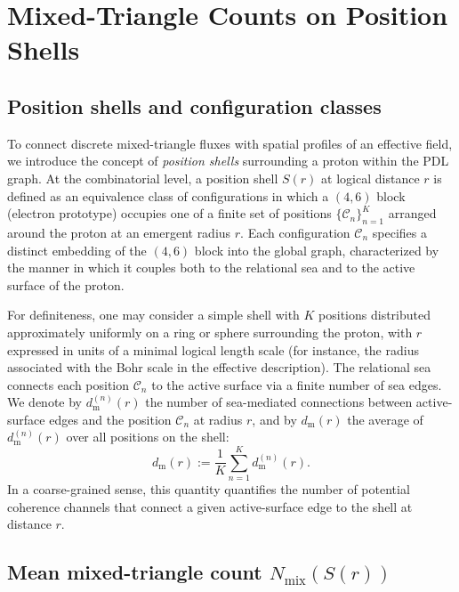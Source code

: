 \documentclass[11pt,a4paper]{article}
\begin{document}
\section{Mixed-Triangle Counts on Position Shells}

\subsection{Position shells and configuration classes}

To connect discrete mixed-triangle fluxes with spatial profiles of an effective field, we introduce the concept of \emph{position shells} surrounding a proton within the PDL graph.  
At the combinatorial level, a position shell $S(r)$ at logical distance $r$ is defined as an equivalence class of configurations in which a $(4,6)$ block (electron prototype) occupies one of a finite set of positions $\{\mathcal{C}_{n}\}_{n=1}^{K}$ arranged around the proton at an emergent radius $r$.\cite{Laubscher2026SchrodingerSketch}
Each configuration $\mathcal{C}_{n}$ specifies a distinct embedding of the $(4,6)$ block into the global graph, characterized by the manner in which it couples both to the relational sea and to the active surface of the proton.

For definiteness, one may consider a simple shell with $K$ positions distributed approximately uniformly on a ring or sphere surrounding the proton, with $r$ expressed in units of a minimal logical length scale (for instance, the radius associated with the Bohr scale in the effective description).\cite{Laubscher2026SchrodingerPDL}
The relational sea connects each position $\mathcal{C}_{n}$ to the active surface via a finite number of sea edges.
We denote by $d_{\mathrm{m}}^{(n)}(r)$ the number of sea-mediated connections between active-surface edges and the position $\mathcal{C}_{n}$ at radius $r$, and by $d_{\mathrm{m}}(r)$ the average of $d_{\mathrm{m}}^{(n)}(r)$ over all positions on the shell:
\[
d_{\mathrm{m}}(r) := \frac{1}{K}\sum_{n=1}^{K} d_{\mathrm{m}}^{(n)}(r).
\]
In a coarse-grained sense, this quantity quantifies the number of potential coherence channels that connect a given active-surface edge to the shell at distance $r$.

\subsection{Mean mixed-triangle count \texorpdfstring{$N_{\mathrm{mix}}(S(r))$}{Nmix(S(r))}}
\end{document}
